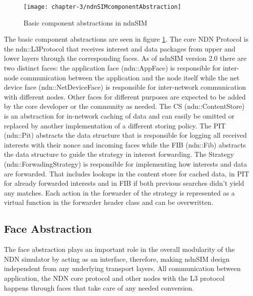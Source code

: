 \vspace{5mm} %

\begin{figure}[H]
  \centering
  \texttt{[image: chapter-3/ndnSIMcomponentAbstraction]}
  \caption{Basic component abstractions in ndnSIM \cite{afanasyev12}}
  \label{fig:ndnSIMcomponentAbstraction}
\end{figure}

\vspace{5mm} %

The basic component abstractions are seen in figure \ref{fig:ndnSIMcomponentAbstraction}. The core NDN Protocol is the ndn::L3Protocol that receives interest and data packages from upper and lower layers through the corresponding faces. As of ndnSIM version 2.0 there are two distinct faces: the application face (ndn::AppFace) is responsible for inter-node communication between the application and the node itself while the net device face (ndn::NetDeviceFace) is responsible for inter-network communication with different nodes. Other faces for different purposes are expected to be added by the core developer or the community as needed. The CS (ndn::ContentStore) is an abstraction for in-network caching of data and can easily be omitted or replaced by another implementation of a different storing policy. The PIT (ndn::Pit) abstracts the data structure that is responsible for logging all received interests with their nonce and incoming faces while the FIB (ndn::Fib) abstracts the data structure to guide the strategy in interest forwarding. The Strategy (ndn::ForwadingStrategy) is responsible for implementing how interests and data are forwarded. That includes lookups in the content store for cached data, in PIT for already forwarded interests and in FIB if both previous searches didn't yield any matches. Each action in the forwarder of the strategy is represented as a virtual function in the forwarder header class and can be overwritten.

\subsection{Face Abstraction}

The face abstraction plays an important role in the overall modularity of the NDN simulator by acting as an interface, therefore, making ndnSIM design independent from any underlying transport layers. All communication between application, the NDN core protocol and other nodes with the L3 protocol happens through faces that take care of any needed conversion.

